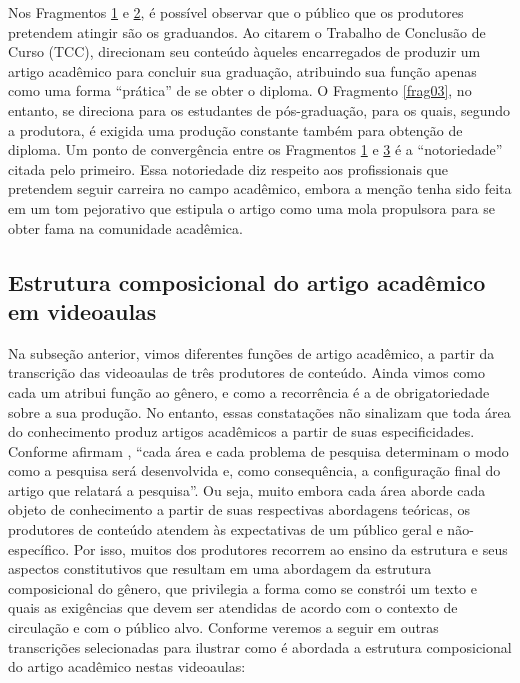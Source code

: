 Nos Fragmentos \hyperref[frag01]{1} e \hyperref[frag02]{2}, é possível observar que o público que os
produtores pretendem atingir são os graduandos. Ao citarem o Trabalho de
Conclusão de Curso (TCC), direcionam seu conteúdo àqueles encarregados
de produzir um artigo acadêmico para concluir sua graduação, atribuindo
sua função apenas como uma forma ``prática'' de se obter o diploma. O
Fragmento \ref{frag03}, no entanto, se direciona para os estudantes de
pós-graduação, para os quais, segundo a produtora, é exigida uma
produção constante também para obtenção de diploma. Um ponto de
convergência entre os Fragmentos \hyperref[frag01]{1} e \hyperref[frag03]{3} é a ``notoriedade'' citada pelo
primeiro. Essa notoriedade diz respeito aos profissionais que pretendem
seguir carreira no campo acadêmico, embora a menção tenha sido feita em
um tom pejorativo que estipula o artigo como uma mola propulsora para se
obter fama na comunidade acadêmica.

\subsection{Estrutura composicional do artigo acadêmico em videoaulas}\label{sub-sec-estrutura}


Na subseção anterior, vimos diferentes funções de artigo acadêmico, a
partir da transcrição das videoaulas de três produtores de conteúdo.
Ainda vimos como cada um atribui função ao gênero, e como a recorrência
é a de obrigatoriedade sobre a sua produção. No entanto, essas
constatações não sinalizam que toda área do conhecimento produz artigos
acadêmicos a partir de suas especificidades. Conforme afirmam \textcite[p.~66]{motta-roth2010}, ``cada área e cada problema de pesquisa
determinam o modo como a pesquisa será desenvolvida e, como
consequência, a configuração final do artigo que relatará a pesquisa''.
Ou seja, muito embora cada área aborde cada objeto de conhecimento a
partir de suas respectivas abordagens teóricas, os produtores de
conteúdo atendem às expectativas de um público geral e não-específico.
Por isso, muitos dos produtores recorrem ao ensino da estrutura e seus
aspectos constitutivos que resultam em uma abordagem da estrutura
composicional do gênero, que privilegia a forma como se constrói um
texto e quais as exigências que devem ser atendidas de acordo com o
contexto de circulação e com o público alvo. Conforme veremos a seguir
em outras transcrições selecionadas para ilustrar como é abordada a
estrutura composicional do artigo acadêmico nestas videoaulas:

